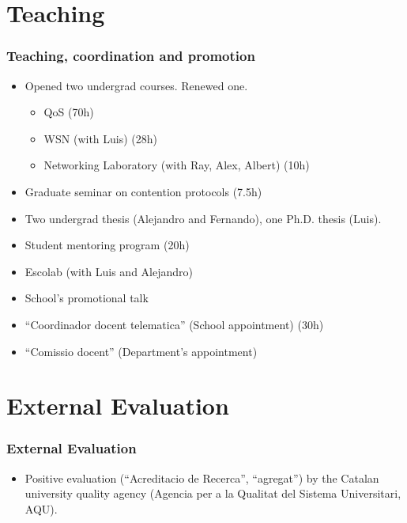 \documentclass{beamer}
\begin{document}
\section{Teaching}
\begin{frame}
  \frametitle{Teaching, coordination and promotion}
      \begin{block}{}
        \begin{itemize}
          \item Opened two undergrad courses. Renewed one.
          \begin{itemize}
              \item QoS (70h)
              \item WSN (with Luis) (28h)
              \item Networking Laboratory (with Ray, Alex, Albert) (10h)
          \end{itemize}
          \item Graduate seminar on contention protocols (7.5h)
          \item Two undergrad thesis (Alejandro and Fernando), one Ph.D. thesis (Luis).
          \item Student mentoring program (20h)
          \item Escolab (with Luis and Alejandro)
          \item School's promotional talk
          \item ``Coordinador docent telematica'' (School appointment) (30h)
          \item ``Comissio docent'' (Department's appointment)
        \end{itemize}
      \end{block}
\end{frame}

\section{External Evaluation}
\begin{frame}
  \frametitle{External Evaluation}
      \begin{block}{}
        \begin{itemize}
          \item Positive evaluation (``Acreditacio de Recerca'', ``agregat'') by the Catalan university quality agency (Agencia per a la Qualitat del Sistema Universitari, AQU).
        \end{itemize}
      \end{block}
\end{frame}
\end{document}
